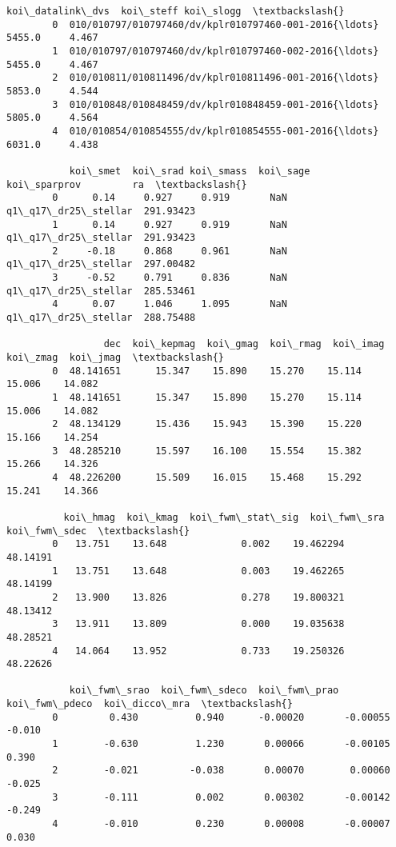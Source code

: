 \documentclass[11pt]{article}
\begin{document}
\begin{Verbatim}[commandchars=\\\{\}]
                                            koi\_datalink\_dvs  koi\_steff koi\_slogg  \textbackslash{}
        0  010/010797/010797460/dv/kplr010797460-001-2016{\ldots}     5455.0     4.467   
        1  010/010797/010797460/dv/kplr010797460-002-2016{\ldots}     5455.0     4.467   
        2  010/010811/010811496/dv/kplr010811496-001-2016{\ldots}     5853.0     4.544   
        3  010/010848/010848459/dv/kplr010848459-001-2016{\ldots}     5805.0     4.564   
        4  010/010854/010854555/dv/kplr010854555-001-2016{\ldots}     6031.0     4.438   
        
           koi\_smet  koi\_srad koi\_smass  koi\_sage         koi\_sparprov         ra  \textbackslash{}
        0      0.14     0.927     0.919       NaN  q1\_q17\_dr25\_stellar  291.93423   
        1      0.14     0.927     0.919       NaN  q1\_q17\_dr25\_stellar  291.93423   
        2     -0.18     0.868     0.961       NaN  q1\_q17\_dr25\_stellar  297.00482   
        3     -0.52     0.791     0.836       NaN  q1\_q17\_dr25\_stellar  285.53461   
        4      0.07     1.046     1.095       NaN  q1\_q17\_dr25\_stellar  288.75488   
        
                 dec  koi\_kepmag  koi\_gmag  koi\_rmag  koi\_imag  koi\_zmag  koi\_jmag  \textbackslash{}
        0  48.141651      15.347    15.890    15.270    15.114    15.006    14.082   
        1  48.141651      15.347    15.890    15.270    15.114    15.006    14.082   
        2  48.134129      15.436    15.943    15.390    15.220    15.166    14.254   
        3  48.285210      15.597    16.100    15.554    15.382    15.266    14.326   
        4  48.226200      15.509    16.015    15.468    15.292    15.241    14.366   
        
          koi\_hmag  koi\_kmag  koi\_fwm\_stat\_sig  koi\_fwm\_sra  koi\_fwm\_sdec  \textbackslash{}
        0   13.751    13.648             0.002    19.462294      48.14191   
        1   13.751    13.648             0.003    19.462265      48.14199   
        2   13.900    13.826             0.278    19.800321      48.13412   
        3   13.911    13.809             0.000    19.035638      48.28521   
        4   14.064    13.952             0.733    19.250326      48.22626   
        
           koi\_fwm\_srao  koi\_fwm\_sdeco  koi\_fwm\_prao  koi\_fwm\_pdeco  koi\_dicco\_mra  \textbackslash{}
        0         0.430          0.940      -0.00020       -0.00055         -0.010   
        1        -0.630          1.230       0.00066       -0.00105          0.390   
        2        -0.021         -0.038       0.00070        0.00060         -0.025   
        3        -0.111          0.002       0.00302       -0.00142         -0.249   
        4        -0.010          0.230       0.00008       -0.00007          0.030   
        

\end{Verbatim}
\end{document}
